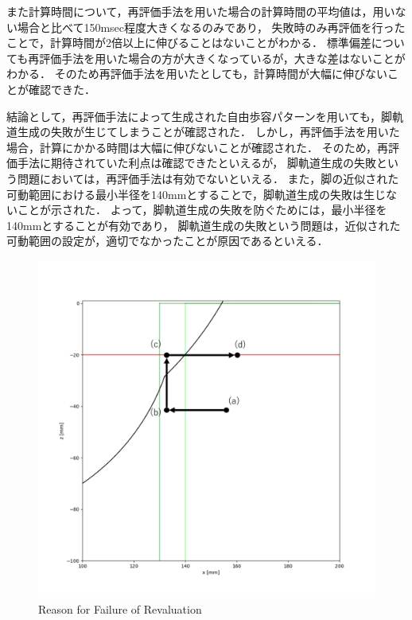 また計算時間について，再評価手法を用いた場合の計算時間の平均値は，用いない場合と比べて150msec程度大きくなるのみであり，
失敗時のみ再評価を行ったことで，計算時間が2倍以上に伸びることはないことがわかる．
標準偏差についても再評価手法を用いた場合の方が大きくなっているが，大きな差はないことがわかる．
そのため再評価手法を用いたとしても，計算時間が大幅に伸びないことが確認できた．

結論として，再評価手法によって生成された自由歩容パターンを用いても，脚軌道生成の失敗が生じてしまうことが確認された．
しかし，再評価手法を用いた場合，計算にかかる時間は大幅に伸びないことが確認された．
そのため，再評価手法に期待されていた利点は確認できたといえるが，
脚軌道生成の失敗という問題においては，再評価手法は有効でないといえる．
また，脚の近似された可動範囲における最小半径を140mmとすることで，脚軌道生成の失敗は生じないことが示された．
よって，脚軌道生成の失敗を防ぐためには，最小半径を140mmとすることが有効であり，
脚軌道生成の失敗という問題は，近似された可動範囲の設定が，適切でなかったことが原因であるといえる．

\begin{figure}[htbp]
  \centering
  \includegraphics[width=0.5\linewidth]{figure/chapter4/revaluation_reason.png}
  \caption{Reason for Failure of Revaluation}
  \label{fig:ch5_revaluation_reason} %
\end{figure}